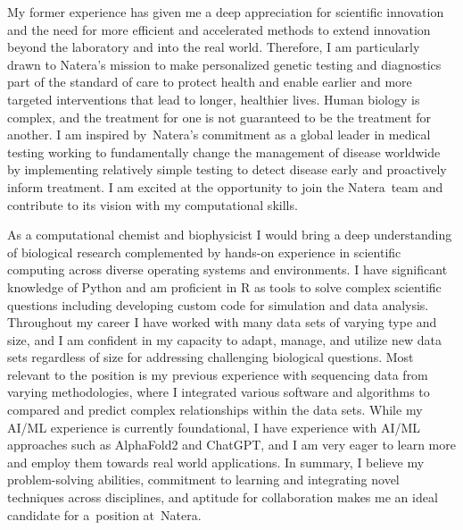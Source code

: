 \documentclass[11pt, a4paper]{awesome-cv}
\newcommand{\companyname}{Natera}
\newcommand{\role}{Senior Bioinformatics Engineer}
\newcommand{\brole}{\textbf{\role}}
\begin{document}
\begin{cvletter}
				
		\lettersection{Why \companyname?}
		My former experience has given me a deep appreciation for scientific innovation and the need for more efficient and accelerated methods to extend innovation beyond the laboratory and into the real world. 	
		Therefore, I am particularly drawn to \companyname's mission to make personalized genetic testing and diagnostics part of the standard of care to protect health and enable earlier and more targeted interventions that lead to longer, healthier lives.
		Human biology is complex, and the treatment for one is not guaranteed to be the treatment for another.
		I am inspired by~\companyname's commitment as a global leader in medical testing working to fundamentally change the management of disease worldwide by implementing relatively simple testing to detect disease early and proactively inform treatment.		
		I am excited at the opportunity to join the \companyname~team and contribute to its vision with my computational skills.
				
		
		As a computational chemist and biophysicist I would bring a deep understanding of biological research complemented by hands-on experience in scientific computing across diverse operating systems and environments. %
		I have significant knowledge of Python and am proficient in R as tools to solve complex scientific questions including developing custom code for simulation and data analysis.
		Throughout my career I have worked with many data sets of varying type and size, and I am confident in my capacity to adapt, manage, and utilize new data sets regardless of size for addressing challenging biological questions. 
		Most relevant to the position is my previous experience with sequencing data from varying methodologies, where I integrated various software and algorithms to compared and predict complex relationships within the data sets. 
		While my AI/ML experience is currently foundational, I have experience with AI/ML approaches such as AlphaFold2 and ChatGPT, and I am  very eager to learn more and employ them towards real world applications.
		In summary, I believe my problem-solving abilities, commitment to learning and integrating novel techniques across disciplines, and aptitude for collaboration makes me an ideal candidate for a~position at~\companyname.
		
	\end{cvletter}
\end{document}
